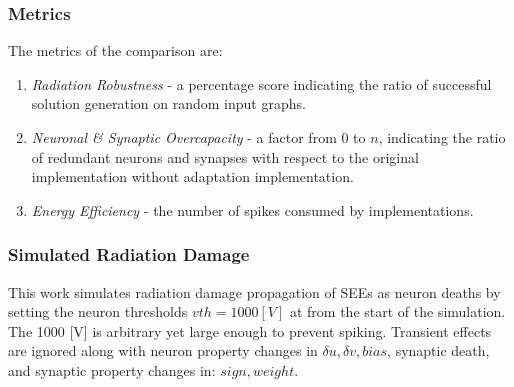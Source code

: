 \subsubsection*{Metrics}\label{subsubsec:metrics}
The metrics of the comparison are:
\begin{enumerate}
    \item \textit{Radiation Robustness} - a percentage score indicating the ratio of successful solution generation on random input graphs.
    \item \textit{Neuronal \& Synaptic Overcapacity} - a factor from 0 to $n$, indicating the ratio of redundant neurons and synapses with respect to the original implementation without adaptation implementation. %
    \item \textit{Energy Efficiency} - the number of spikes consumed by implementations.
\end{enumerate}

\subsubsection*{Simulated Radiation Damage}\label{subsubsec:simulated_radiation_damage}
This work simulates radiation damage propagation of SEEs as neuron deaths by setting the neuron thresholds $vth=1000 [V]$ at from the start of the simulation. The 1000 [V] is arbitrary yet large enough to prevent spiking. Transient effects are ignored along with neuron property changes in $\delta u,\delta v, bias$, synaptic death, and synaptic property changes in: $sign,weight$.

